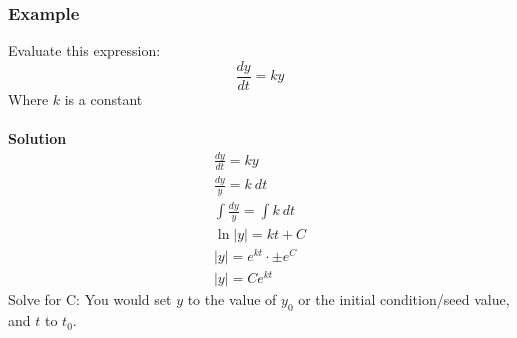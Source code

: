 \documentclass[letterpaper,10pt,twoside,twocolumn,openany]{book}
\begin{document}
\subsubsection{Example}
Evaluate this expression:
$$
    \frac{dy}{dt} = ky
$$
Where $k$ is a constant
\\~\\ 
\textbf{Solution}
\begin{gather*}
    \frac{dy}{dt} = ky\\ 
    \frac{dy}{y} = k\ dt\\ 
    \int\frac{dy}{y} = \int k\ dt\\ 
    \ln|y| = kt + C\\ 
    |y| = e^{kt}\cdot \pm e^C\\ 
    |y| = Ce^{kt}
\end{gather*}
Solve for C: You would set $y$ to the value of $y_0$ or the initial condition/seed value, and $t$ to $t_0$.
\end{document}
